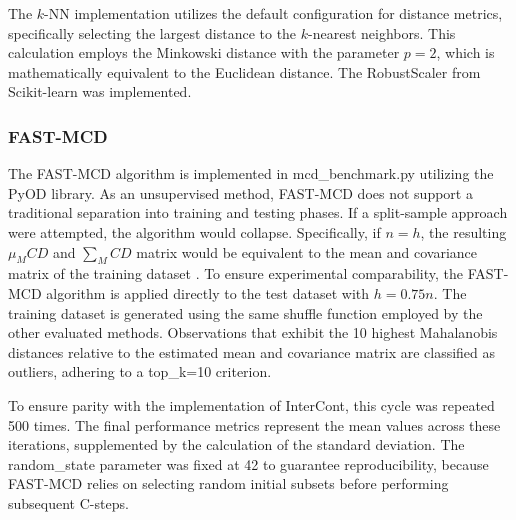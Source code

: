 The $k$-NN implementation utilizes the default configuration for distance metrics, specifically selecting the largest distance to the $k$-nearest neighbors. 
This calculation employs the Minkowski distance with the parameter $p=2$, which is mathematically equivalent to the Euclidean distance.
The RobustScaler from Scikit-learn was implemented.

\subsubsection*{FAST-MCD}
The FAST-MCD algorithm is implemented in mcd\_benchmark.py utilizing the PyOD library. 
As an unsupervised method, FAST-MCD does not support a traditional separation into training and testing phases. 
If a split-sample approach were attempted, the algorithm would collapse.
Specifically, if $n=h$, the resulting  $\mu_MCD$ and $\sum_MCD$ matrix would be equivalent to the mean and covariance matrix of the training dataset \citep[p. 217]{rousseeuw1999fast}. 
To ensure experimental comparability, the FAST-MCD algorithm is applied directly to the test dataset with $h = 0.75n$. 
The training dataset is generated using the same shuffle function employed by the other evaluated methods. 
Observations that exhibit the 10 highest Mahalanobis distances relative to the estimated mean and covariance matrix are classified as outliers, adhering to a top\_k=10 criterion. 


To ensure parity with the implementation of InterCont, this cycle was repeated 500 times. 
The final performance metrics represent the mean values across these iterations, supplemented by the calculation of the standard deviation. 
The random\_state parameter was fixed at 42 to guarantee reproducibility, because FAST-MCD relies on selecting random initial subsets before performing subsequent C-steps.
















